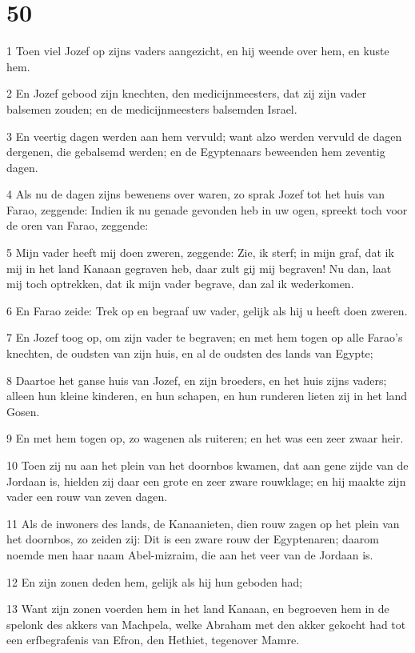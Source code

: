 \chapter{50}

\par 1 Toen viel Jozef op zijns vaders aangezicht, en hij weende over hem, en kuste hem.
\par 2 En Jozef gebood zijn knechten, den medicijnmeesters, dat zij zijn vader balsemen zouden; en de medicijnmeesters balsemden Israel.
\par 3 En veertig dagen werden aan hem vervuld; want alzo werden vervuld de dagen dergenen, die gebalsemd werden; en de Egyptenaars beweenden hem zeventig dagen.
\par 4 Als nu de dagen zijns bewenens over waren, zo sprak Jozef tot het huis van Farao, zeggende: Indien ik nu genade gevonden heb in uw ogen, spreekt toch voor de oren van Farao, zeggende:
\par 5 Mijn vader heeft mij doen zweren, zeggende: Zie, ik sterf; in mijn graf, dat ik mij in het land Kanaan gegraven heb, daar zult gij mij begraven! Nu dan, laat mij toch optrekken, dat ik mijn vader begrave, dan zal ik wederkomen.
\par 6 En Farao zeide: Trek op en begraaf uw vader, gelijk als hij u heeft doen zweren.
\par 7 En Jozef toog op, om zijn vader te begraven; en met hem togen op alle Farao's knechten, de oudsten van zijn huis, en al de oudsten des lands van Egypte;
\par 8 Daartoe het ganse huis van Jozef, en zijn broeders, en het huis zijns vaders; alleen hun kleine kinderen, en hun schapen, en hun runderen lieten zij in het land Gosen.
\par 9 En met hem togen op, zo wagenen als ruiteren; en het was een zeer zwaar heir.
\par 10 Toen zij nu aan het plein van het doornbos kwamen, dat aan gene zijde van de Jordaan is, hielden zij daar een grote en zeer zware rouwklage; en hij maakte zijn vader een rouw van zeven dagen.
\par 11 Als de inwoners des lands, de Kanaanieten, dien rouw zagen op het plein van het doornbos, zo zeiden zij: Dit is een zware rouw der Egyptenaren; daarom noemde men haar naam Abel-mizraim, die aan het veer van de Jordaan is.
\par 12 En zijn zonen deden hem, gelijk als hij hun geboden had;
\par 13 Want zijn zonen voerden hem in het land Kanaan, en begroeven hem in de spelonk des akkers van Machpela, welke Abraham met den akker gekocht had tot een erfbegrafenis van Efron, den Hethiet, tegenover Mamre.
